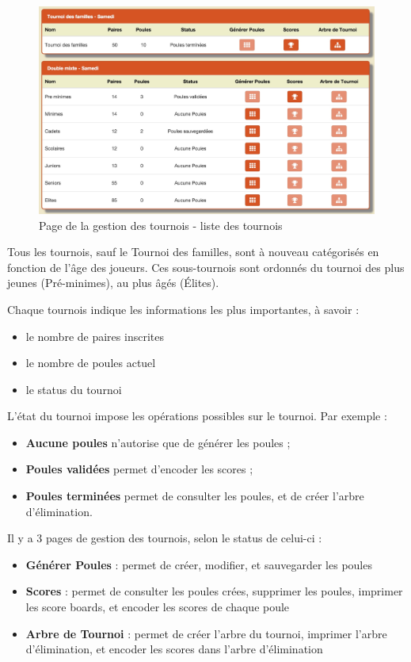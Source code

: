 \begin{figure}[H]
\centering
\includegraphics[scale=0.15]{gestion-tournois/gestion-tournois-liste.jpg}
\caption{Page de la gestion des tournois - liste des tournois}
\end{figure}

Tous les tournois, sauf le Tournoi des familles, sont à nouveau catégorisés en fonction de l'âge des joueurs. Ces sous-tournois sont ordonnés du tournoi des plus jeunes (Pré-minimes), au plus âgés (Élites).\newline

Chaque tournois indique les informations les plus importantes, à savoir :

\begin{itemize}
\item le nombre de paires inscrites
\item le nombre de poules actuel
\item le status du tournoi
\end{itemize}
\bigskip
L'état du tournoi impose les opérations possibles sur le tournoi. Par exemple :

\begin{itemize}
\item  \textbf{Aucune poules} n'autorise que de générer les poules ;
\item \textbf{Poules validées} permet d'encoder les scores ;
\item \textbf{Poules terminées} permet de consulter les poules, et de créer l'arbre d'élimination.
\end{itemize}
\bigskip
Il y a 3 pages de gestion des tournois, selon le status de celui-ci :

\begin{itemize}
\item \textbf{Générer Poules} : permet de créer, modifier, et sauvegarder les poules
\item \textbf{Scores} : permet de consulter les poules crées, supprimer les poules, imprimer les score boards, et encoder les scores de chaque poule
\item \textbf{Arbre de Tournoi} : permet de créer l'arbre du tournoi, imprimer l'arbre d'élimination, et encoder les scores dans l'arbre d'élimination
\end{itemize}

